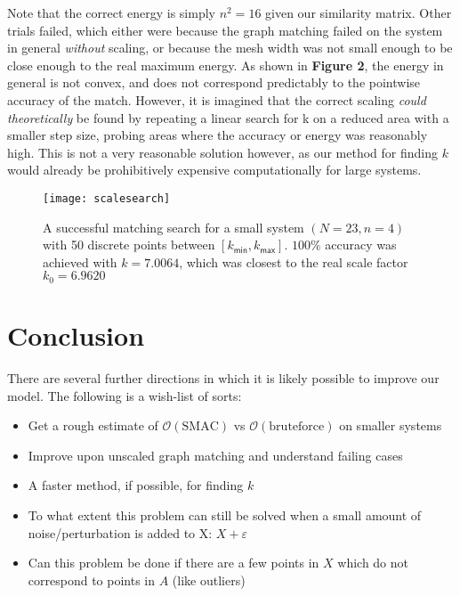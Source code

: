 \documentclass[10pt,twocolumn]{article}
\begin{document}
{Note that the correct energy is simply $n^2=16$ given our similarity matrix.
Other trials failed, which either were because the graph matching failed on the
system in general \emph{without} scaling, or because the mesh width was not
small enough to be close enough to the real maximum energy. As shown in
\textbf{Figure 2}, the energy in general is not convex, and does not correspond
predictably to the pointwise accuracy of the match. However, it is imagined
that the correct scaling \emph{could theoretically} be found by repeating a
linear search for k on a reduced area with a smaller step size, probing areas
where the accuracy or energy was reasonably high. This is not a very reasonable
solution however, as our method for finding $k$ would already be prohibitively
expensive computationally for large systems.

\begin{figure}[t]
    \centering
    \texttt{[image: scalesearch]}
    \caption{A successful matching search for a small system $(N=23,n=4)$ with 50 discrete points between
      $[k_{\mathsf{min}}, k_{\mathsf{max}}]$. $100\%$ accuracy was achieved
    with $k=7.0064$, which was closest to the real scale factor $k_0=6.9620$}
\end{figure}

\section{Conclusion}

There are several further directions in which it is likely possible to improve our model. The following is a wish-list of sorts:

\begin{itemize}
  \item Get a rough estimate of $\mathcal{O}(\mathrm{SMAC})$ vs $\mathcal{O}(\mathrm{brute force})$ on smaller systems
  \item Improve upon unscaled graph matching and understand failing cases
  \item A faster method, if possible, for finding $k$ 
  \item To what extent this problem can still be solved when a small amount of noise/perturbation is added to X: $X + \varepsilon$
  \item Can this problem be done if there are a few points in $X$ which do not correspond to points in $A$ (like outliers)
\end{itemize}


}
\end{document}
